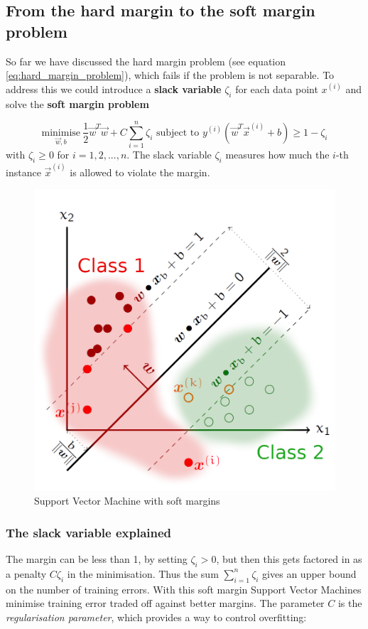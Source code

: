 \documentclass[a4paper, 11pt]{article}
\begin{document}

\subsection{From the hard margin to the soft margin problem}

So far we have discussed the hard margin problem (see equation \ref{eq:hard_margin_problem}), which fails if the problem is not separable. To address this we could introduce a \textbf{slack variable} $\zeta_i$ for each data point $x^{(i)}$ and solve the \textbf{soft margin problem}

\begin{equation}\label{eq:soft_margin_problem}
\underset{\vec{w}, b}{\text{minimise}}\ \frac{1}{2}\vec{w}^T \vec{w} + C\sum_{i=1}^{n}\zeta_i \text{ subject to } y^{(i)}(\vec{w}^T \vec{x}^{(i)} + b) \geq 1 - \zeta_i
\end{equation}
\noindent
with $\zeta_i \geq 0$ for $i=1,2,...,n$. The slack variable $\zeta_i$ measures how much the $i$-th instance $\vec{x}^{(i)}$ is allowed to violate the margin.

\begin{figure}
	\centering
	\includegraphics[keepaspectratio,width=0.4\linewidth]{Pictures/soft_margin_svm}
	\caption{Support Vector Machine with soft margins}
	\label{fig:svm_softmargins}
\end{figure}

\subsubsection{The slack variable explained}

The margin can be less than 1, by setting $\zeta_i > 0$, but then this gets factored in as a penalty $C\zeta_i$ in the minimisation. Thus the sum $\sum_{i=1}^{n}\zeta_i$ gives an upper bound on the number of training errors. With this soft margin Support Vector Machines minimise training error traded off against better margins. The parameter $C$ is the \textit{regularisation parameter}, which provides a way to control overfitting:
\end{document}
